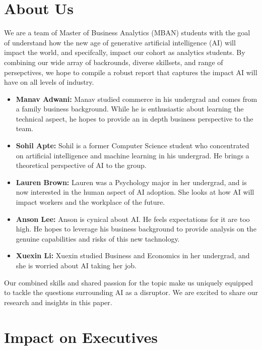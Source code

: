 \documentclass[
]{book}
\begin{document}
\hypertarget{about-us}{%
\chapter{About Us}\label{about-us}}

We are a team of Master of Business Analytics (MBAN) students with the goal of understand how the new age of generative artificial intelligence (AI) will impact the world, and specifcally, impact our cohort as analytics students. By combining our wide array of backrounds, diverse skillsets, and range of persepctives, we hope to compile a robust report that captures the impact AI will have on all levels of industry.

\begin{itemize}
\item
  \textbf{Manav Adwani:} Manav studied commerce in his undergrad and comes from a family business background. While he is enthusiastic about learning the technical aspect, he hopes to provide an in depth business perspective to the team.
\item
  \textbf{Sohil Apte:} Sohil is a former Computer Science student who concentrated on artificial intelligence and machine learning in his undergrad. He brings a theoretical perspective of AI to the group.
\item
  \textbf{Lauren Brown:} Lauren was a Psychology major in her undergrad, and is now interested in the human aspect of AI adoption. She looks at how AI will impact workers and the workplace of the future.
\item
  \textbf{Anson Lee:} Anson is cynical about AI. He feels expectations for it are too high. He hopes to leverage his business background to provide analysis on the genuine capabilities and risks of this new tachnology.
\item
  \textbf{Xuexin Li:} Xuexin studied Business and Economics in her undergrad, and she is worried about AI taking her job.
\end{itemize}

Our combined skills and shared passion for the topic make us uniquely equipped to tackle the questions surrounding AI as a disruptor. We are excited to share our research and insights in this paper.

\hypertarget{impact-on-executives}{%
\chapter{Impact on Executives}\label{impact-on-executives}}
\end{document}
